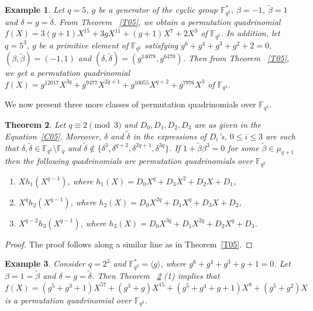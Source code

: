 \documentclass[12pt]{amsart}
\newtheorem{thm}{Theorem}[section]
\newtheorem{exmp}[thm]{Example}
\newtheorem{rmk}[thm]{Remark}
\numberwithin{equation}{section}
\theoremstyle{definition}
\newcommand{\F}{\mathbb F}
\begin{document}


 \begin{exmp}
 Let $q=5$, $g$ be a generator of the cyclic group $\F_{q^2}^{*}$, $\beta=-1$, $\tilde{\beta}=1$ and $\delta=g=\tilde{\delta}$. From Theorem ~\ref{T05}, we obtain a permutation quadrinomial $f(X)=3(g+1)X^{15}+3gX^{11}+(g+1)X^7+2X^3$ of $\F_{q^2}$. In addition,
 let $q=5^3$, $g$ be a primitive element of $\F_{q^2}$ satisfying $g^6 + g^4 + g^3 + g^2 + 2=0$, $(\beta, \tilde{\beta}) = (-1, 1)$ and $(\delta, \tilde{\delta}) = (g^{14078}, g^{6470})$.
 Then from Theorem ~\ref{T05}, we get a permutation quadrinomial $f(X)= g^{12017}X^{3q} + g^{9477}X^{2q+1} + g^{10055}X^{q+2} + g^{7976}X^3$ of $\F_{q^2}$.
 \end{exmp}
We now present three more classes of permutation quadrinomials over $\F_{q^2}$. 
\begin{thm}\label{T15}
 Let $q\equiv 2 \pmod 3$ and $D_0, D_1, D_2, D_3$ are as given in the Equation~\eqref{C05}. Moreover, $\delta$ and $\tilde \delta$ in the expressions of $D_i$'s, $0 \leq i \leq 3$ are such that $\delta, \tilde \delta \in \F_{q^2}\setminus\F_{q}$ and $\tilde \delta \not \in \{ \delta^3, \delta^{q+2}, \delta^{2q+1}, \delta^{3q}\}$. If $1+{\tilde \beta}\beta^3=0$ for some ${\tilde \beta}\in \mu_{q+1}$ then the following quadrinomials are permutation quadrinomials over $\F_{q^2}$
 \begin{enumerate}
 \item $Xh_1(X^{q-1})$, where $h_1(X)= D_0X^q+D_3X^2 +D_2X+D_1$,
 \item  $X^{q}h_2(X^{q-1})$, where $h_2(X)=D_0X^{2q}+D_1X^q+D_3X+D_2$,
 \item  $X^{q-2}h_3(X^{q-1})$, where $h_3(X)=D_0X^{3q}+D_1X^{2q}+D_2X^q+D_3$.
 \end{enumerate}
\end{thm}
\begin{proof}
The proof follows along a similar line as in Theorem~\ref{T05}.
\end{proof}
\begin{exmp}
 Consider $q=2^3$ and $\F_{q^2}^{*}=\langle g \rangle $, where $g^6 + g^4 + g^3 + g + 1=0$. Let $\beta=1= \tilde{\beta}$ and $\delta=g=\tilde{\delta}$. Then Theorem ~\ref{T15} (1) implies that $f(X)=(g^5+g^3+1)X^{57}+(g^3+g)X^{15}+(g^5+g^4+g+1)X^8+(g^5+g^2)X$ is a permutation quadrinomial over $\F_{q^2}$. 
  \end{exmp}
\end{document}
